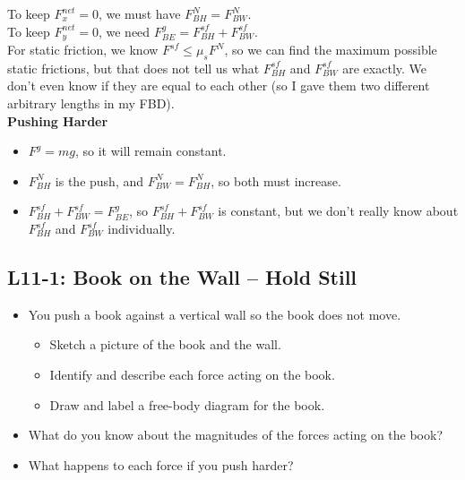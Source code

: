 \documentclass[]{article}
\newcommand{\Week}{11}
\begin{document}
\begin{TeacherMargin}
\begin{center}
\end{center}
To keep $F^{net}_{x} = 0$, we must have $F^{N}_{BH} = F^{N}_{BW}$. \\
To keep $F^{net}_{y}=0$, we need $F^{g}_{BE} = F^{sf}_{BH} + F^{sf}_{BW}$. \\
For static friction, we know $F^{sf}\leq\mu_{s}F^{N}$, so we can find the maximum possible static frictions, but that does not tell us what $F^{sf}_{BH}$ and $F^{sf}_{BW}$ are exactly. We don't even know if they are equal to each other (so I gave them two different arbitrary lengths in my FBD). \\

\noindent\textbf{Pushing Harder}
\begin{itemize}
	\item $F^{g}=mg$, so it will remain constant.
	\item $F^{N}_{BH}$ is the push, and $F^{N}_{BW} = F^{N}_{BH}$, so both must increase.
	\item $F^{sf}_{BH}+F^{sf}_{BW} = F^{g}_{BE}$, so $F^{sf}_{BH}+F^{sf}_{BW}$ is constant, but we don't really know about $F^{sf}_{BH}$ and $F^{sf}_{BW}$ individually.
\end{itemize}
\end{TeacherMargin}
\begin{PresentSpace}
\vspace{-10pt}
\section*{L\Week-1: Book on the Wall -- Hold Still}
\vspace{-10pt}
\begin{itemize}
	\item You push a book against a vertical wall so the book does not move.
	\begin{itemize}
		\item Sketch a picture of the book and the wall.
		\item Identify and describe each force acting on the book.
		\item Draw and label a free-body diagram for the book.
	\end{itemize}
	\item What do you know about the magnitudes of the forces acting on the book?
	\item What happens to each force if you push harder?
\end{itemize}
\end{PresentSpace}
\end{document}

